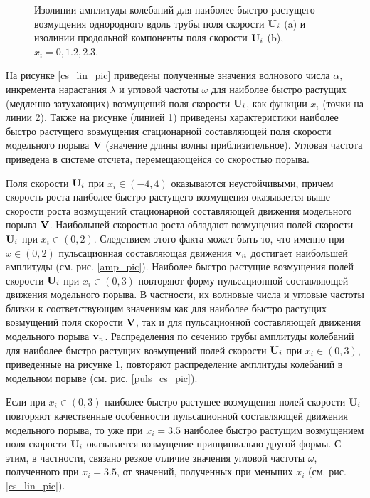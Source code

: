 \begin{figure}
\caption{Изолинии амплитуды колебаний для наиболее быстро растущего возмущения однородного вдоль трубы поля скорости $\mathbf{U}_i$ (a) и изолинии продольной компоненты поля скорости $\mathbf{U}_i$ (b), $x_i = 0, 1.2, 2.3$.}
\label{cs_lin_map_pic}
\end{figure}

На рисунке \ref{cs_lin_pic} приведены полученные значения волнового числа $\alpha$, инкремента нарастания $\lambda$ и угловой частоты $\omega$ для наиболее быстро растущих (медленно затухающих) возмущений поля скорости $\mathbf{U}_i$, как функции $x_i$ (точки на линии 2). Также на рисунке (линией 1) приведены характеристики наиболее быстро растущего возмущения стационарной составляющей поля скорости модельного порыва $\mathbf{V}$ (значение длины волны приблизительное). Угловая частота приведена в системе отсчета, перемещающейся со скоростью порыва. 

Поля скорости $\mathbf{U}_i$ при $x_i \in (-4,4)$ оказываются неустойчивыми, причем скорость роста наиболее быстро растущего возмущения оказывается выше скорости роста возмущений стационарной составляющей движения модельного порыва $\mathbf{V}$. Наибольшей скоростью роста обладают возмущения полей скорости $\mathbf{U}_i$ при $x_i \in (0, 2)$. Следствием этого факта может быть то, что именно при $x \in (0,2)$ пульсационная составляющая движения $\mathbf{v}_n$ достигает наибольшей амплитуды (см. рис. \ref{amp_pic}). Наиболее быстро растущие  возмущения полей скорости $\mathbf{U}_i$ при $x_i \in (0,3)$ повторяют форму пульсационной составляющей движения модельного порыва. В частности, их волновые числа и угловые частоты близки к соответствующим значениям как для наиболее быстро растущих возмущений поля скорости $\mathbf{V}$, так и для пульсационной составляющей движения модельного порыва $\mathbf{v}_n$. Распределения по сечению трубы амплитуды колебаний для наиболее быстро растущих возмущений полей скорости $\mathbf{U}_i$ при $x_i \in (0,3)$, приведенные на рисунке \ref{cs_lin_map_pic}, повторяют распределение амплитуды колебаний в модельном порыве (см. рис. \ref{puls_cs_pic}).

Если при $x_i \in (0,3)$ наиболее быстро растущее возмущения полей скорости $\mathbf{U}_i$ повторяют качественные особенности пульсационной составляющей движения модельного порыва, то уже при $x_i = 3.5$ наиболее быстро растущим возмущением поля скорости $\mathbf{U}_i$ оказывается возмущение принципиально другой формы. С этим, в частности, связано резкое отличие значения угловой частоты $\omega$, полученного при $x_i = 3.5$, от значений, полученных при меньших $x_i$ (см. рис. \ref{cs_lin_pic}). 

